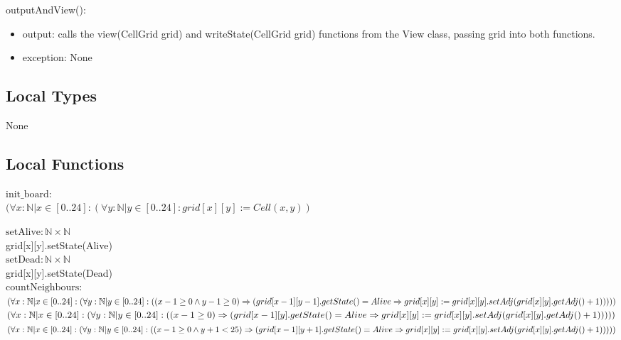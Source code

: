 \documentclass[12pt]{article}
\begin{document}
\noindent outputAndView():
\begin{itemize}
\item output: calls the view(CellGrid grid) and writeState(CellGrid grid) functions from the View class, passing grid into both functions.
\item exception: None
\end{itemize}

\subsection*{Local Types}
None

\subsection*{Local Functions}

\noindent $\text{init\_board} : $\\
$ (\forall x : \mathbb{N} | x \in [0..24] : (\forall y : \mathbb{N} | y \in [0..24] : grid[x][y] := Cell(x,y))$

\noindent $\text{setAlive} : \mathbb{N} \times \mathbb{N}$\\
grid[x][y].setState(Alive)\\

\noindent $\text{setDead} : \mathbb{N} \times \mathbb{N}$\\
grid[x][y].setState(Dead)\\

\noindent $\text{countNeighbours} : $\\
$ (\forall x : \mathbb{N} | x \in [0..24] : (\forall y : \mathbb{N} | y \in [0..24] :\\
((x-1 \ge 0 \land y-1 \ge 0) \Rightarrow (grid[x-1][y-1].getState() = Alive \Rightarrow\\ grid[x][y] := grid[x][y].setAdj(grid[x][y].getAdj()+1)))))$\\

\noindent$ (\forall x : \mathbb{N} | x \in [0..24] : (\forall y : \mathbb{N} | y \in [0..24] :\\
((x-1 \ge 0) \Rightarrow (grid[x-1][y].getState() = Alive \Rightarrow\\ grid[x][y] := grid[x][y].setAdj(grid[x][y].getAdj()+1)))))$\\

\noindent$ (\forall x : \mathbb{N} | x \in [0..24] : (\forall y : \mathbb{N} | y \in [0..24] :\\
((x-1 \ge 0 \land y + 1 < 25) \Rightarrow (grid[x-1][y+1].getState() = Alive \Rightarrow\\ grid[x][y] := grid[x][y].setAdj(grid[x][y].getAdj()+1)))))$\\
\end{document}

